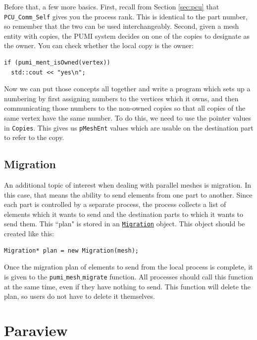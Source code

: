\documentclass{article}
\begin{document}
{Before that, a few more basics.
First, recall from Section \ref{sec:pcu} that \texttt{PCU\_Comm\_Self}
gives you the process rank.
This is identical to the part number, so remember that the two
can be used interchangeably.
Second, given a mesh entity with copies, the PUMI system decides
on one of the copies to designate as the owner.
You can check whether the local copy is the owner:

\begin{lstlisting}
if (pumi_ment_isOwned(vertex))
  std::cout << "yes\n";
\end{lstlisting}

Now we can put those concepts all together and write a program
which sets up a numbering by first assigning numbers to
the vertices which it owns, and then communicating those
numbers to the non-owned copies so that all copies
of the same vertex have the same number.
To do this, we need to use the pointer values in \texttt{Copies}.
This gives us \texttt{pMeshEnt} values which are usable
on the destination part to refer to the copy.



\subsection{Migration}

An additional topic of interest when dealing with parallel
meshes is migration.
In this case, that means the ability to send elements
from one part to another.
Since each part is controlled by a separate process,
the process collects a list of elements which it
wants to send and the destination parts to which
it wants to send them.
This ``plan" is stored in an
\href{http://scorec.rpi.edu/~dibanez/core/classapf_1_1Migration.html}{\texttt{Migration}}
object.
This object should be created like this:

\begin{lstlisting}
Migration* plan = new Migration(mesh);
\end{lstlisting}

Once the migration plan of elements to send from
the local process is complete, it is given to the \texttt{pumi$\_$mesh$\_$migrate}
function.
All processes should call this function at the
same time, even if they have nothing to send.
This function will delete the plan, so users
do not have to delete it themselves.

\appendix

\section{Paraview}
\label{sec:paraview}

}
\end{document}
